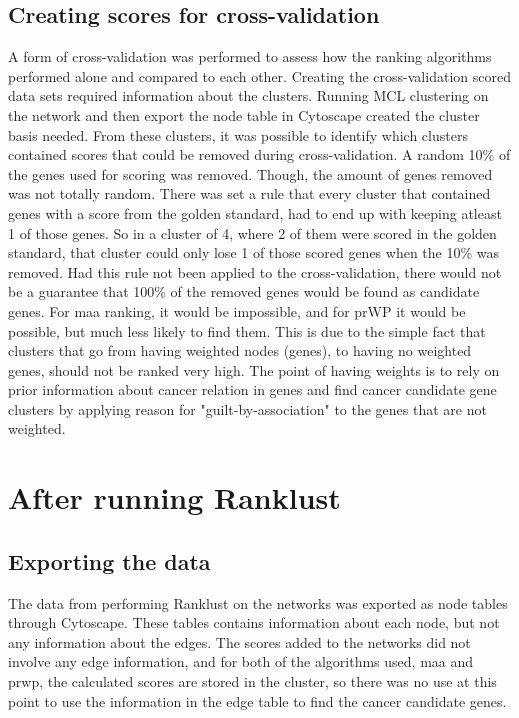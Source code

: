 \subsection{Creating scores for cross-validation}
A form of cross-validation was performed to assess how the ranking algorithms
performed alone and compared to each other. Creating the cross-validation scored
data sets required information about the clusters. Running MCL clustering on the
network and then export the node table in Cytoscape created the cluster basis
needed. From these clusters, it was possible to identify which clusters
contained scores that could be removed during cross-validation. A random 10\%
of the genes used for scoring was removed. Though, the amount of genes removed
was not totally random. There was set a rule that every cluster that contained
genes with a score from the golden standard, had to end up with keeping atleast
1 of those genes. So in a cluster of 4, where 2 of them were scored in the
golden standard, that cluster could only lose 1 of those scored genes when the
10\% was removed. Had this rule not been applied to the cross-validation, there
would not be a guarantee that 100\% of the removed genes would be found as
candidate genes. For \gls{maa} ranking, it would be impossible, and for \gls{pr}WP it would
be possible, but much less likely to find them. This is due to the simple fact
that clusters that go from having weighted nodes (genes), to having no weighted
genes, should not be ranked very high. The point of having weights is to rely on
prior information about cancer relation in genes and find cancer candidate gene
clusters by applying reason for "guilt-by-association" to the genes that are not
weighted.

\section{After running Ranklust}
\subsection{Exporting the data}
The data from performing Ranklust on the networks was exported as node tables
through Cytoscape. These tables contains information about each node, but not
any information about the edges. The scores added to the networks did not
involve any edge information, and for both of the algorithms used, \gls{maa} and \gls{prwp},
the calculated scores are stored in the cluster, so there was no use at this
point to use the information in the edge table to find the cancer candidate
genes.

